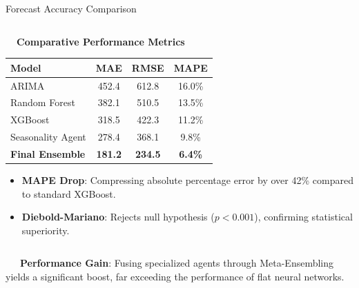 \documentclass{beamer}
\begin{document}
\begin{frame}{Forecast Accuracy Comparison}
\begin{columns}[T]
    \begin{column}{0.48\textwidth}
        \begin{smallcard}[0.98\textwidth, top=3pt, bottom=3pt, left=4pt, right=4pt, boxsep=0.5pt]
            \centering \textbf{\textcolor{primaryDark}{\small {}~~Comparative Performance Metrics}}
            \vspace{0.08cm}
            \fontsize{6.8pt}{8.2pt}\selectfont
            \begin{table}
            \centering
            \begin{tabular}{l c c c}
                \toprule
                \textbf{Model} & \textbf{MAE} & \textbf{RMSE} & \textbf{MAPE} \\
                \midrule
                ARIMA & 452.4 & 612.8 & 16.0\% \\
                Random Forest & 382.1 & 510.5 & 13.5\% \\
                XGBoost & 318.5 & 422.3 & 11.2\% \\
                Seasonality Agent & 278.4 & 368.1 & 9.8\% \\
                \textbf{Final Ensemble} & \textbf{181.2} & \textbf{234.5} & \textbf{6.4\%} \\
                \bottomrule
            \end{tabular}
            \end{table}
            \vspace{-0.1cm}
            \begin{itemize}\setlength\itemsep{2.5pt}\setlength\parskip{0pt}
                \item \textbf{MAPE Drop}: Compressing absolute percentage error by over 42\% compared to standard XGBoost.
                \item \textbf{Diebold-Mariano}: Rejects null hypothesis ($p < 0.001$), confirming statistical superiority.
            \end{itemize}
        \end{smallcard}
    \end{column}
\end{columns}

\vspace{0.15cm}
\begin{tcolorbox}[enhanced, colback=primaryblue!4, colframe=primaryblue!30, boxrule=0.35pt,
  arc=3.5pt, width=0.98\textwidth, left=4pt, right=4pt, top=2.5pt, bottom=2.5pt, boxsep=0pt,
  halign=center, shadow={0.5pt}{-0.5pt}{0pt}{black!8}]
    \fontsize{5.5pt}{6.5pt}\selectfont
    \textcolor{primaryDark}{~~~\textbf{Performance Gain}: Fusing specialized agents through Meta-Ensembling yields a significant boost, far exceeding the performance of flat neural networks.}
\end{tcolorbox}
\end{frame}
\end{document}
